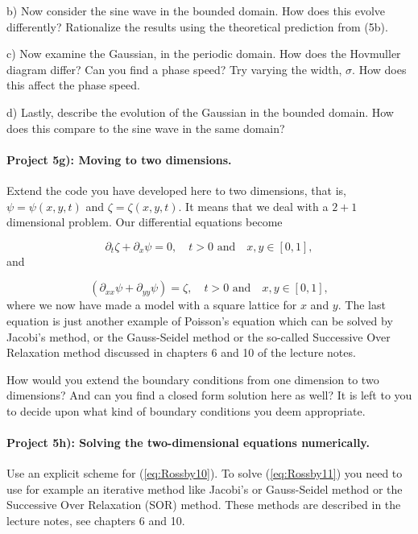 \documentclass[%
oneside,                 %
final,                   %
10pt]{article}
\begin{document}
b) Now consider the sine wave in the bounded domain. How does this
evolve differently? Rationalize the results using the theoretical
prediction from (5b).

c) Now examine the Gaussian, in the periodic domain. How does the
Hovmuller diagram differ? Can you find a phase speed? Try varying
the width, $\sigma$. How does this affect the phase speed.

d) Lastly, describe the evolution of the Gaussian in the bounded
domain. How does this compare to the sine wave in the same domain?


\paragraph{Project 5g): Moving to two dimensions.}
Extend the code you have developed here to two dimensions, that is,
$\psi = \psi(x,y,t)$ and $\zeta = \zeta(x,y,t)$. It means that we deal
with a $2+1$ dimensional problem. Our differential equations become

\begin{equation}
  \label{eq:Rossby10}
	\partial_t\zeta + \partial_x\psi = 0, \quad \textrm{$t > 0$ and} \quad x,y\in [0,1],
\end{equation}
and

\begin{equation}
  \label{eq:Rossby11}
	\left( \partial_{xx}\psi + \partial_{yy}\psi \right) = \zeta, \quad \textrm{$t > 0$ and} \quad x,y\in [0,1],
\end{equation}
where we now have made a model with a square lattice for $x$ and $y$. The last equation is just another example of Poisson's equation which can be solved by Jacobi's method, or the Gauss-Seidel method or the so-called Successive Over Relaxation method discussed in chapters 6 and 10 of the lecture notes.

How would you extend the boundary conditions from one dimension to two
dimensions? And can you find a closed form solution here as well?  It
is left to you to decide upon what kind of boundary conditions you
deem appropriate.

\paragraph{Project 5h): Solving the two-dimensional equations numerically.}
Use an explicit scheme for (\ref{eq:Rossby10}). To solve
(\ref{eq:Rossby11}) you need to use for example an iterative method
like Jacobi's or Gauss-Seidel method or the Successive Over Relaxation (SOR) method. These methods are described in the lecture notes, see chapters 6 and 10.
\end{document}
